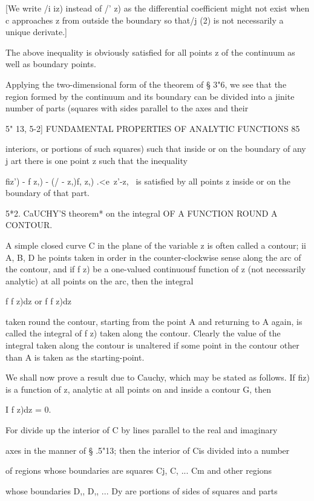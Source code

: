 [We write /i iz) instead of /' z) as the differential coefficient
might not exist when c approaches z from outside the boundary so
that/j (2) is not necessarily a unique derivate.]

The above inequality is obviously satisfied for all points z of the
continuum as well as boundary points.

Applying the two-dimensional form of the theorem of § 3"6, we see that
the region formed by the continuum and its boundary can be divided
into a jinite number of parts (squares with sides parallel to the axes
and their

5" 13, 5-2] FUNDAMENTAL PROPERTIES OF ANALYTIC FUNCTIONS 85

interiors, or portions of such squares) such that inside or on the
boundary of any j art there is one point z such that the inequality

fiz') - f z,) - (/ - z,)f, z,) .<e\ z'-z, \ is satisfied by all points
z inside or on the boundary of that part.

5*2. CaUCHY'S theorem* on the integral OF A FUNCTION ROUND A CONTOUR.

A simple closed curve C in the plane of the variable z is often called
a contour; ii A, B, D he points taken in order in the
counter-clockwise sense along the arc of the contour, and if f z) be a
one-valued continuousf function of z (not necessarily analytic) at all
points on the arc, then the integral

f f z)dz or f f z)dz

taken round the contour, starting from the point A and returning to A
again, is called the integral of f z) taken along the contour. Clearly
the value of the integral taken along the contour is unaltered if some
point in the contour other than A is taken as the starting-point.

We shall now prove a result due to Cauchy, which may be stated as
follows. If fiz) is a function of z, analytic at all points on and
inside a contour G, then

I f z)dz = 0.

For divide up the interior of C by lines parallel to the real and
imaginary

axes in the manner of § .5"13; then the interior of Cis divided into
a number

of regions whose boundaries are squares Cj, C, ... Cm and other
regions

whose boundaries D,, D,, ... Dy are portions of sides of squares and
parts

